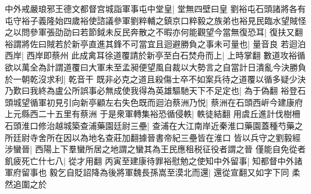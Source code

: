 中外戒嚴琅邪王德文都督宫城詣軍事屯中堂皇|{
	堂無四壁曰皇}
劉裕屯石頭諸將各有屯守裕子義隆始四歲裕使諮議參軍劉粹輔之鎮京口粹毅之族弟也裕見民臨水望賊怪之以問參軍張劭劭曰若節鉞未反民奔散之不暇亦何能觀望今當無復恐耳|{
	復扶又翻}
裕謂將佐曰賊若於新亭直進其鋒不可當宜且迴避勝負之事未可量也|{
	量音良}
若迴泊西岸|{
	西岸即蔡州}
此成禽耳徐道覆請於新亭至白石焚舟而上|{
	上時掌翻}
數道攻裕循欲以萬全為計謂道覆曰大軍未至孟昶便望風自裁以大勢言之自當計日潰亂今決勝負於一朝乾沒求利|{
	乾音干}
既非必克之道且殺傷士卒不如案兵待之道覆以循多疑少決乃歎曰我終為盧公所誤事必無成使我得為英雄驅馳天下不足定也|{
	為于偽翻}
裕登石頭城望循軍初見引向新亭顧左右失色既而迴泊蔡洲乃悦|{
	蔡洲在石頭西㟁今建康府上元縣西二十五里有蔡洲}
于是衆軍轉集裕恐循侵軼|{
	軼徒結翻}
用虞丘進計伐樹柵石頭淮口修治越城築查浦藥園廷尉三壘|{
	查浦在大江南岸近秦淮口藥園蓋種芍藥之所廷尉寺舍所在因以為地名查莊加翻據晉書帝紀三壘皆在淮口}
皆以兵守之劉毅經涉蠻晉|{
	西陽上下羣蠻所居之地謂之蠻其為王民應租税征役者謂之晉}
僅能自免從者飢疲死亡什七八|{
	從才用翻}
丙寅至建康待罪裕慰勉之使知中外留事|{
	知都督中外諸軍府留事也}
毅乞自貶詔降為後將軍魏長孫嵩至漠北而還|{
	還從宣翻又如字下同}
柔然追圍之於

